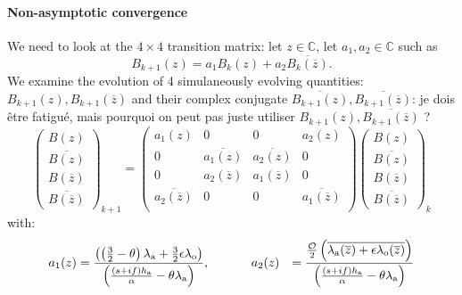 \paragraph{Non-asymptotic convergence}
We need to look at the $4\times 4$ transition matrix: let $z\in\mathbb{C}$,
let $a_1, a_2 \in \mathbb{C}$ such as
\begin{equation}
	B_{k+1}(z) = a_1 B_{k}(z) + a_2 \overline{B_{k}(\overline{z})}.
\end{equation}
We examine the evolution of 4 simulaneously evolving quantities:
$B_{k+1}(z), B_{k+1}(\overline{z})$ and their complex conjugate
$\overline{B_{k+1}(z)}, \overline{B_{k+1}(\overline{z})}$:
{\color{red} je dois être fatigué, mais pourquoi on peut pas juste utiliser $B_{k+1}(z), \overline{B_{k+1}(\overline{z})}$} ?
\begin{equation}
	\label{eq:OASchwarz_transitionMatrixDD26}
\begin{pmatrix}
	B(z) \\
	\overline{B(z)}\\
	{B(\overline{z})}\\
	\overline{B(\overline{z})}
\end{pmatrix}_{k+1}
 =
\begin{pmatrix}
	a_1(z) & 0 & 0 & a_2(z) \\
	0 & \overline{a_1({z})} &
		\overline{a_2({z})} & 0\\
	0 & {a_2(\overline{z})} &
		{a_1(\overline{z})} & 0\\
	\overline{a_2(\overline{z})} & 0 & 0 &
		\overline{a_1(\overline{z})} \\
\end{pmatrix}
\begin{pmatrix}
	B(z) \\
	\overline{B(z)}\\
	{B(\overline{z})}\\
	\overline{B(\overline{z})}
\end{pmatrix}_{k}
\end{equation}
with:
\begin{equation}
\begin{aligned}
    a_1(z)
    &= \frac{\left(\left(\frac{3}{2} - \theta\right) 
    \lambda_{\rm a}
    + \frac{3}{2} \epsilon \lambda_{\rm o} \right)}
	{\left(\frac{(s+if)h_{\rm a}}{\alpha} -
		\theta \lambda_{\rm a}\right)}, ~~~~~~~~~~
    a_2(z)
    &= \frac{
 \frac{
    \mathcal{O}
    }{2}
    \left(
    \overline{
    \lambda_{\rm a}(\overline{z})
    +
    \epsilon\lambda_{\rm o}(\overline{z})}
    \right)   
    }{\left(\frac{(s+if)h_{\rm a}}{\alpha} - \theta \lambda_{\rm a}\right)}
\end{aligned}
\end{equation}
